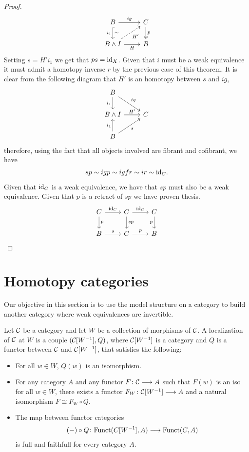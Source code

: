 \begin{proof}
\[\begin{tikzcd}
		B & C \\
		{B\wedge I} & B
		\arrow["ig", from=1-1, to=1-2]
		\arrow["{i_1}"', "\sim", hook, from=1-1, to=2-1]
		\arrow["p", two heads, from=1-2, to=2-2]
		\arrow["{H'}"', dashed, from=2-1, to=1-2]
		\arrow["H"', from=2-1, to=2-2]
	\end{tikzcd}\]
	Setting $s=H'i_1$ we get that $ps = \mathrm{id}_X$. Given that $i$ must be a weak equivalence it must admit a homotopy inverse $r$ by the previous case of this theorem. It is clear from the following diagram that $H'$ is an homotopy between $s$ and $ig$,
	\[\begin{tikzcd}
		B \\
		{B\wedge I} & C \\
		B
		\arrow["{i_1}"', from=1-1, to=2-1]
		\arrow["ig", from=1-1, to=2-2]
		\arrow["{H'}", from=2-1, to=2-2]
		\arrow["{i_1}", from=3-1, to=2-1]
		\arrow["s"', from=3-1, to=2-2]
	\end{tikzcd}\]
	therefore, using the fact that all objects involved are fibrant and cofibrant, we have
	\[
	sp \sim igp \sim igfr \sim ir \sim \mathrm{id}_C.
	\]
	Given that $\mathrm{id}_C$ is a weak equivalence, we have that $sp$ must also be a weak equivalence. Given that $p$ is a retract of $sp$ we have proven thesis.
	\[\begin{tikzcd}
		C & C & C \\
		B & C & B
		\arrow["{\id_C}", from=1-1, to=1-2]
		\arrow["p", from=1-1, to=2-1]
		\arrow["{\id_C}", from=1-2, to=1-3]
		\arrow["sp", from=1-2, to=2-2]
		\arrow["p"', from=1-3, to=2-3]
		\arrow["s", from=2-1, to=2-2]
		\arrow["p", from=2-2, to=2-3]
	\end{tikzcd}\]
\end{proof}



\section{Homotopy categories}

Our objective in this section is to use the model structure on a category to build another category where weak equivalences are invertible.

\begin{definition}
	Let $\mathcal{C}$ be a category and let $W$ be a collection of morphisms of $\mathcal{C}$. A localization of $\mathcal{C}$ at $W$ is  a couple $(\mathcal{C}[W^{-1}], Q)$, where $\mathcal{C}[W^{-1}]$ is a category and $Q$ is a functor between $\mathcal{C}$ and $\mathcal{C}[W^{-1}]$, that satisfies the following:
	\begin{itemize}
		\item For all $w \in W$, $Q(w)$ is an isomorphism.
		\item For any category $A$ and any functor $F \colon \mathcal{C} \longrightarrow A$ such that $F(w)$ is an iso for all $w \in W$, there exists a functor $F_W \colon \mathcal{C}[W^{-1}] \longrightarrow A$ and a natural isomorphism $F \cong F_W \circ Q$.
		\item The map between functor categories \[ (-) \circ Q \colon \mathrm{Funct}(C[W^{-1}], A) \longrightarrow \mathrm{Funct}(C,A) \] is full and faithfull for every category $A$.
	\end{itemize}
\end{definition}

